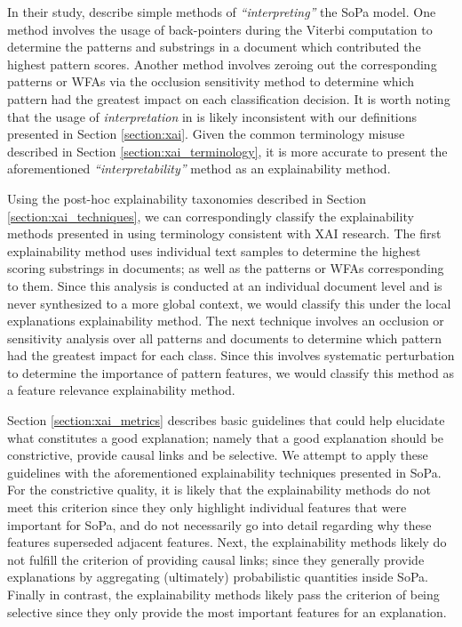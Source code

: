 In their study, \citet[Page 7, Section
7]{schwartz2018sopa} describe simple methods of \textit{``interpreting''} the
SoPa model. One method involves the usage of back-pointers during the Viterbi
computation to determine the patterns and substrings in a document which
contributed the highest pattern scores. Another method involves zeroing out the
corresponding patterns or WFAs via the occlusion sensitivity method to determine
which pattern had the greatest impact on each classification decision. It is
worth noting that the usage of \textit{interpretation} in
\citet{schwartz2018sopa} is likely inconsistent with our definitions presented
in Section \ref{section:xai}. Given the common terminology misuse described in
Section \ref{section:xai_terminology}, it is more accurate to present the
aforementioned \textit{``interpretability''} method as an explainability method.

Using the post-hoc explainability taxonomies described in Section
\ref{section:xai_techniques}, we can correspondingly classify the explainability
methods presented in \citet{schwartz2018sopa} using terminology consistent with
XAI research. The first explainability method uses individual text samples to
determine the highest scoring substrings in documents; as well as the patterns
or WFAs corresponding to them. Since this analysis is conducted at an individual
document level and is never synthesized to a more global context, we would
classify this under the local explanations explainability method. The next
technique involves an occlusion or sensitivity analysis over all patterns and
documents to determine which pattern had the greatest impact for each class.
Since this involves systematic perturbation to determine the importance of
pattern features, we would classify this method as a feature relevance
explainability method.

Section \ref{section:xai_metrics} describes basic guidelines that could help
elucidate what constitutes a good explanation; namely that a good explanation
should be constrictive, provide causal links and be selective. We attempt to
apply these guidelines with the aforementioned explainability techniques
presented in SoPa. For the constrictive quality, it is likely that the
explainability methods do not meet this criterion since they only highlight
individual features that were important for SoPa, and do not necessarily go into
detail regarding why these features superseded adjacent features. Next, the
explainability methods likely do not fulfill the criterion of providing causal
links; since they generally provide explanations by aggregating (ultimately)
probabilistic quantities inside SoPa. Finally in contrast, the explainability
methods likely pass the criterion of being selective since they only provide the
most important features for an explanation.

